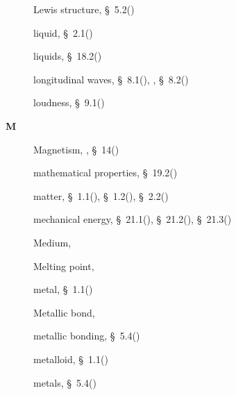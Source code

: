 \begin{multicols}{2}
{\begin{description}
	  \item[] \noindent\raggedright Lewis structure,  \S~5.2(\pageref{m38701})
	  
	  \item[] \noindent\raggedright liquid,  \S~2.1(\pageref{m38736})
	  
	  \item[] \noindent\raggedright liquids,  \S~18.2(\pageref{m38712})
	  
	  \item[] \noindent\raggedright longitudinal waves,  \S~8.1(\pageref{m38782}),  \pageref{id2444157},  \S~8.2(\pageref{m38783})
	  
	  \item[] \noindent\raggedright loudness,  \S~9.1(\pageref{m38799})
	  \vspace{.3cm}
	  \item[{\large \bfseries M}]\noindent\raggedright
	  Magnetism,  \pageref{id2410309},  \S~14(\pageref{m37830})
	  
	  \item[] \noindent\raggedright mathematical properties,  \S~19.2(\pageref{m38813})
	  
	  \item[] \noindent\raggedright matter,  \S~1.1(\pageref{m38708}),  \S~1.2(\pageref{m38706}),  \S~2.2(\pageref{m38734})
	  
	  \item[] \noindent\raggedright mechanical energy,  \S~21.1(\pageref{m38784}),  \S~21.2(\pageref{m38785}),  \S~21.3(\pageref{m38786})
	  
	  \item[] \noindent\raggedright Medium,  \pageref{id2434692}
	  
	  \item[] \noindent\raggedright Melting point,  \pageref{id2412224}
	  
	  \item[] \noindent\raggedright metal,  \S~1.1(\pageref{m38708})
	  
	  \item[] \noindent\raggedright Metallic bond,  \pageref{id2431026}
	  
	  \item[] \noindent\raggedright metallic bonding,  \S~5.4(\pageref{m38694})
	  
	  \item[] \noindent\raggedright metalloid,  \S~1.1(\pageref{m38708})
	  
	  \item[] \noindent\raggedright metals,  \S~5.4(\pageref{m38694})
	  

\end{description}}
\end{multicols}
